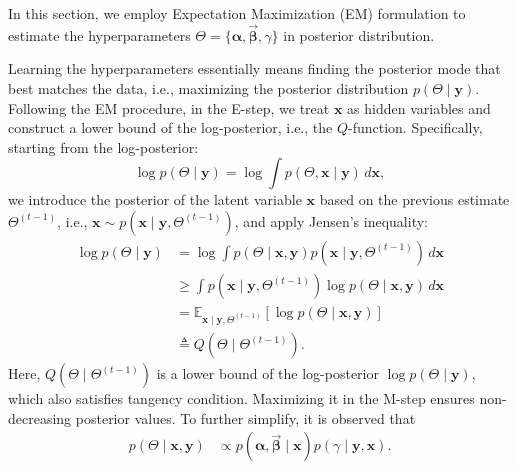 \documentclass[lettersize,journal]{IEEEtran}
\theoremstyle{remark}
\begin{document}
In this section, we employ Expectation Maximization (EM) formulation \cite{dempster1977maximum} to estimate the hyperparameters  \( \Theta = \{\boldsymbol{\alpha}, \vec{\boldsymbol{\beta}}, \gamma\} \) in posterior distribution.

Learning the hyperparameters essentially means finding the posterior mode that best matches the data, i.e., 
maximizing the posterior distribution \( p(\Theta\mid \mathbf{y}) \). Following the EM procedure, in the E-step, we treat \( \mathbf{x} \) as hidden variables and construct a lower bound of the log-posterior, i.e., the $Q$-function. Specifically, starting from the log-posterior:
\[
\log p(\Theta \mid \mathbf{y}) = \log \int p(\Theta, \mathbf{x} \mid \mathbf{y}) \, d\mathbf{x},
\]
we introduce the posterior of the latent variable $\mathbf{x}$ based on the previous estimate $\Theta^{(t-1)}$, i.e., $\mathbf{x} \sim p(\mathbf{x} \mid \mathbf{y}, \Theta^{(t-1)})$, and apply Jensen's inequality:
\begin{align}
	\log p(\Theta \mid \mathbf{y}) &= \log \int p(\Theta \mid \mathbf{x}, \mathbf{y}) p(\mathbf{x} \mid \mathbf{y}, \Theta^{(t-1)}) \, d\mathbf{x} \nonumber\\
	&\ge \int p(\mathbf{x} \mid \mathbf{y}, \Theta^{(t-1)}) \log p(\Theta \mid \mathbf{x}, \mathbf{y}) \, d\mathbf{x} \nonumber\\
	&= \mathbb{E}_{\mathbf{x} \mid \mathbf{y}, \Theta^{(t-1)}} [\log p(\Theta \mid \mathbf{x}, \mathbf{y})] \nonumber\\
	&\triangleq Q(\Theta \mid \Theta^{(t-1)}). \label{Q1}
\end{align}
Here, $Q(\Theta \mid \Theta^{(t-1)})$ is a lower bound of the log-posterior $\log p(\Theta \mid \mathbf{y})$, which also satisfies tangency condition. Maximizing it in the M-step ensures non-decreasing posterior values.
 To further simplify, it is observed that 
\begin{align}
	p(\Theta \mid \mathbf{x}, \mathbf{y})&\propto p(\boldsymbol{\alpha},\vec{\boldsymbol{\beta}} \mid \mathbf{x}) p(\gamma \mid \mathbf{y}, \mathbf{x}).\label{prop}
\end{align}
\end{document}
